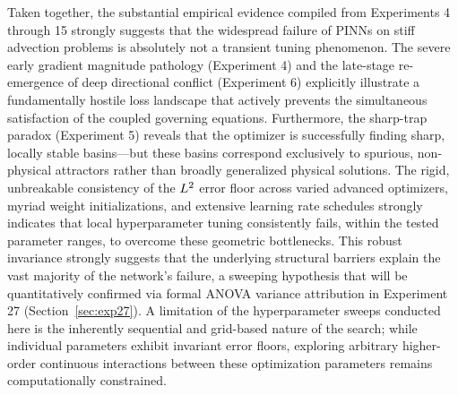 Taken together, the substantial empirical evidence compiled from Experiments 4 through 15 strongly suggests that the widespread failure of PINNs on stiff advection problems is absolutely not a transient tuning phenomenon. The severe early gradient magnitude pathology (Experiment 4) and the late-stage re-emergence of deep directional conflict (Experiment 6) explicitly illustrate a fundamentally hostile loss landscape that actively prevents the simultaneous satisfaction of the coupled governing equations. Furthermore, the sharp-trap paradox (Experiment 5) reveals that the optimizer is successfully finding sharp, locally stable basins—but these basins correspond exclusively to spurious, non-physical attractors rather than broadly generalized physical solutions. The rigid, unbreakable consistency of the $L^2$ error floor across varied advanced optimizers, myriad weight initializations, and extensive learning rate schedules strongly indicates that local hyperparameter tuning consistently fails, within the tested parameter ranges, to overcome these geometric bottlenecks. This robust invariance strongly suggests that the underlying structural barriers explain the vast majority of the network's failure, a sweeping hypothesis that will be quantitatively confirmed via formal ANOVA variance attribution in Experiment 27 (Section~\ref{sec:exp27}). A limitation of the hyperparameter sweeps conducted here is the inherently sequential and grid-based nature of the search; while individual parameters exhibit invariant error floors, exploring arbitrary higher-order continuous interactions between these optimization parameters remains computationally constrained.
